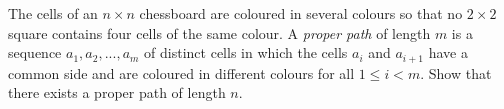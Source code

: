 The cells of an $n \times n$ chessboard are coloured in several colours so that no $2\times 2$ square contains four cells of the same colour. A \textit{proper path } of length $m$ is a sequence $a_1,a_2,..., a_m$ of distinct cells in which the cells $a_i$ and $a_{i+1}$ have a common side and are coloured in different colours for all $1 \le i < m$. Show that there exists a proper path of length $n$.